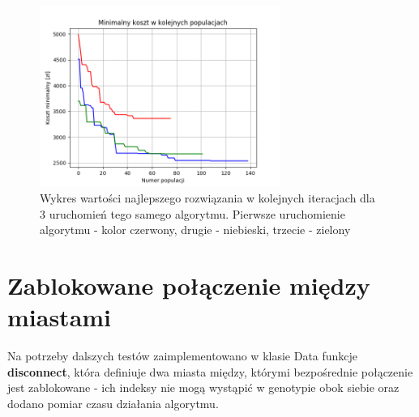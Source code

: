 \documentclass[12pt, oneside, final]{report}
\begin{document}
\begin{figure}[ht!]
\centering
\includegraphics[width=0.7\textwidth]{graphics/diff-population}
\caption{Wykres wartości najlepszego rozwiązania w kolejnych iteracjach dla 3 uruchomień tego samego algorytmu. Pierwsze uruchomienie algorytmu - kolor czerwony, drugie - niebieski, trzecie - zielony}
\label{fig:diff-population}
\end{figure}

\section{Zablokowane połączenie między miastami}
Na potrzeby dalszych testów zaimplementowano w klasie Data funkcje \textbf{disconnect}, która definiuje dwa miasta między, którymi bezpośrednie połączenie jest zablokowane - ich indeksy nie mogą wystąpić w genotypie obok siebie oraz dodano pomiar czasu działania algorytmu.
\end{document}
